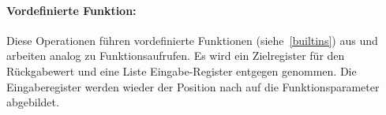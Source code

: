 \documentclass[twoside,a4paper,fleqn,12pt]{book}
\begin{document}


\paragraph{Vordefinierte Funktion:} Diese Operationen führen vordefinierte Funktionen (siehe~\ref{builtins}) aus
und arbeiten analog zu Funktionsaufrufen. Es wird ein Zielregister für den Rückgabewert %
und eine Liste Eingabe-Register entgegen genommen. Die Eingaberegister werden wieder der Position nach auf die Funktionsparameter abgebildet.





\end{document}
